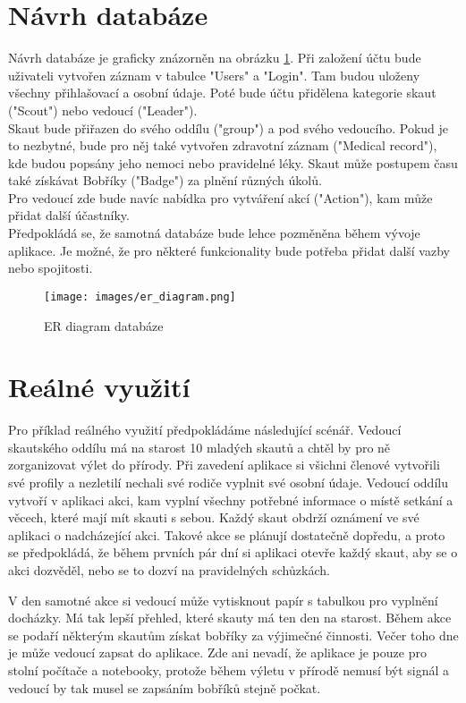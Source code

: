 \documentclass[twoside]{ctuthesis}
\begin{document}
\section{Návrh databáze}
Návrh databáze je graficky znázorněn na obrázku \ref{fig:er_diagram}. Při založení účtu bude uživateli vytvořen záznam v tabulce "Users" a "Login". Tam budou uloženy všechny přihlašovací a osobní údaje. Poté bude účtu přidělena kategorie skaut ("Scout") nebo vedoucí ("Leader"). \\

Skaut bude přiřazen do svého oddílu ("group") a pod svého vedoucího. Pokud je to nezbytné, bude pro něj také vytvořen zdravotní záznam ("Medical record"), kde budou popsány jeho nemoci nebo pravidelné léky. Skaut může postupem času také získávat Bobříky ("Badge") za plnění různých úkolů. \\

Pro vedoucí zde bude navíc nabídka pro vytváření akcí ("Action"), kam může přidat další účastníky. \\

Předpokládá se, že samotná databáze bude lehce pozměněna během vývoje aplikace. Je možné, že pro některé funkcionality bude potřeba přidat další vazby nebo spojitosti. \\

\begin{figure}
    \centering
    \texttt{[image: images/er\_diagram.png]}
    \caption{ER diagram databáze}
    \label{fig:er_diagram}
\end{figure}


\section{Reálné využití}
Pro příklad reálného využití předpokládáme následující scénář. Vedoucí skautského oddílu má na starost 10 mladých skautů a chtěl by pro ně zorganizovat výlet do přírody. Při zavedení aplikace si všichni členové vytvořili své profily a nezletilí nechali své rodiče vyplnit své osobní údaje. Vedoucí oddílu vytvoří v aplikaci akci, kam vyplní všechny potřebné informace o místě setkání a věcech, které mají mít skauti s sebou. Každý skaut obdrží oznámení ve své aplikaci o nadcházející akci. Takové akce se plánují dostatečně dopředu, a proto se předpokládá, že během prvních pár dní si aplikaci otevře každý skaut, aby se o akci dozvěděl, nebo se to dozví na pravidelných schůzkách.

V den samotné akce si vedoucí může vytisknout papír s tabulkou pro vyplnění docházky. Má tak lepší přehled, které skauty má ten den na starost. Během akce se podaří některým skautům získat bobříky za výjimečné činnosti. Večer toho dne je může vedoucí zapsat do aplikace. Zde ani nevadí, že aplikace je pouze pro stolní počítače a notebooky, protože během výletu v přírodě nemusí být signál a vedoucí by tak musel se zapsáním bobříků stejně počkat.
\end{document}
